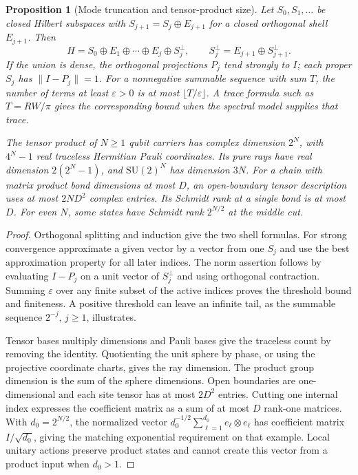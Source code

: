 \documentclass[11pt,reqno]{amsart}
\newtheorem{proposition}[theorem]{Proposition}
\theoremstyle{definition}
\theoremstyle{remark}
\numberwithin{equation}{section}
\newcommand{\SU}{\mathrm{SU}}
\begin{document}
\begin{proposition}[Mode truncation and tensor-product size]\label{m10:modes}
Let \(S_0,S_1,\ldots\) be closed Hilbert subspaces with
\(S_{j+1}=S_j\oplus E_{j+1}\) for a closed orthogonal shell
\(E_{j+1}\). Then
\[
 H=S_0\oplus E_1\oplus\cdots\oplus E_j\oplus S_j^\perp,\qquad
 S_j^\perp=E_{j+1}\oplus S_{j+1}^\perp .
\]
If the union is dense, the orthogonal projections \(P_j\) tend
strongly to \(I\); each proper \(S_j\) has \(\|I-P_j\|=1\).
For a nonnegative summable sequence with sum \(T\), the number
of terms at least \(\varepsilon>0\) is at most
\(\lfloor T/\varepsilon\rfloor\). A trace formula such as
\(T=RW/\pi\) gives the corresponding bound when the spectral
model supplies that trace.

The tensor product of \(N\ge1\) qubit carriers has complex
dimension \(2^N\), with \(4^N-1\) real traceless Hermitian
Pauli coordinates. Its pure rays have real dimension
\(2(2^N-1)\), and \(\SU(2)^N\) has dimension \(3N\).
For a chain with matrix product bond dimensions at most \(D\),
an open-boundary tensor description uses at most \(2ND^2\)
complex entries. Its Schmidt rank at a single bond is at most
\(D\). For even \(N\), some states have Schmidt rank \(2^{N/2}\)
at the middle cut.
\end{proposition}

\begin{proof}
Orthogonal splitting and induction give the two shell formulas.
For strong convergence approximate a given vector by a vector
from one \(S_j\) and use the best approximation property for
all later indices. The norm assertion follows by evaluating
\(I-P_j\) on a unit vector of \(S_j^\perp\) and using
orthogonal contraction. Summing \(\varepsilon\) over any
finite subset of the active indices proves the threshold
bound and finiteness. A positive threshold can leave an
infinite tail, as the summable sequence \(2^{-j}\), \(j\ge1\),
illustrates.

Tensor bases multiply dimensions and Pauli bases give the
traceless count by removing the identity. Quotienting the
unit sphere by phase, or using the projective coordinate
charts, gives the ray dimension. The product group dimension
is the sum of the sphere dimensions. Open boundaries are
one-dimensional and each site tensor has at most \(2D^2\)
entries. Cutting one internal index expresses the coefficient
matrix as a sum of at most \(D\) rank-one matrices. With
\(d_0=2^{N/2}\), the normalized vector
\(d_0^{-1/2}\sum_{\ell=1}^{d_0}e_\ell\otimes e_\ell\) has
coefficient matrix \(I/\sqrt{d_0}\), giving the matching
exponential requirement on that example. Local unitary actions
preserve product states and cannot create this vector from a
product input when \(d_0>1\).
\end{proof}
\end{document}

